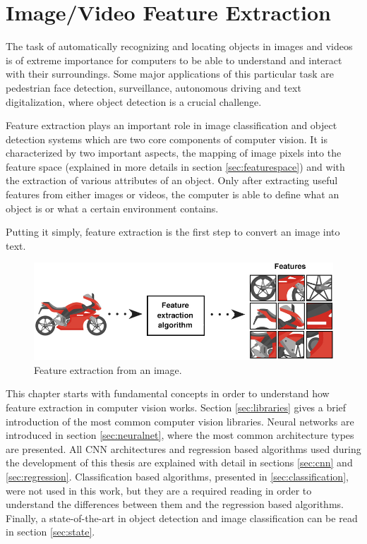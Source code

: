 \cleardoublepage


\chapter{Image/Video Feature Extraction }
\label{ch:computervision}

\par The task of automatically recognizing and locating objects in images and videos is of extreme importance for computers to be able to understand and interact with their surroundings. Some major applications of this particular task are pedestrian face detection, surveillance, autonomous driving and text digitalization, where object detection is a crucial challenge. \cite{Agarwal2019}


\par Feature extraction plays an important role in image classification and object detection systems which are two core components of computer vision. It is characterized by two important aspects, the mapping of image pixels into the feature space (explained in more details in section \ref{sec:featurespace}) and with the extraction of various attributes of an object. Only after extracting useful features from either images or videos, the computer is able to define what an object is or what a certain environment contains.\cite{Tiwari2013}

Putting it simply, feature extraction is the first step to convert an image into text.

\begin{figure}[htb]
    \centering
    \includegraphics[scale = 0.55]{Sections/2StateOfTheArt/2_images/Feature_extraction.png}
    \caption{Feature extraction from an image. \cite{feature} }  
\end{figure}


\par This chapter starts with fundamental concepts in order to understand how feature extraction in computer vision works. Section \ref{sec:libraries} gives a brief introduction of the most common computer vision libraries. Neural networks are introduced in section \ref{sec:neuralnet}, where the most common architecture types are presented. All CNN architectures and regression based algorithms used during the development of this thesis are explained with detail in sections \ref{sec:cnn} and \ref{sec:regression}. Classification based algorithms, presented in \ref{sec:classification}, were not used in this work, but they are a required reading in order to understand the differences between them and the regression based algorithms. Finally, a state-of-the-art in object detection and image classification can be read in section \ref{sec:state}.

